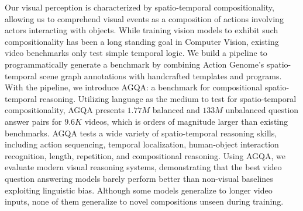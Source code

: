 Our visual perception is characterized by spatio-temporal compositionality, allowing us to comprehend visual events as a composition of actions involving actors interacting with objects. While training vision models to exhibit such compositionality has been a long standing goal in Computer Vision, existing video benchmarks only test simple temporal logic. 
We build a pipeline to programmatically generate a benchmark by combining Action Genome's spatio-temporal scene graph annotations with handcrafted templates and programs.
With the pipeline, we introduce AGQA: a benchmark for compositional spatio-temporal reasoning. Utilizing language as the medium to test for spatio-temporal compositionality, AGQA presents $1.77M$ balanced and $133M$ unbalanced question answer pairs for $9.6K$ videos, which is orders of magnitude larger than existing benchmarks.
AGQA tests a wide variety of spatio-temporal reasoning skills, including action sequencing, temporal localization, human-object interaction recognition, length, repetition, and compositional reasoning.
Using AGQA, we evaluate modern visual reasoning systems, demonstrating that the best video question answering models barely perform better than non-visual baselines exploiting linguistic bias. Although some models generalize to longer video inputs, none of them generalize to novel compositions unseen during training.